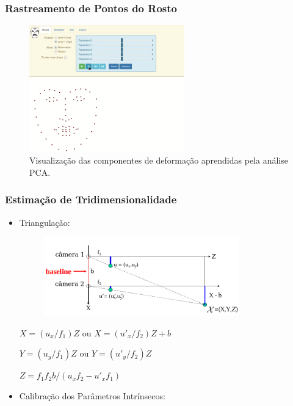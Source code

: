 \documentclass[brazil]{beamer}
\begin{document}
\begin{frame}
\frametitle{Rastreamento de Pontos do Rosto}
      \begin{figure}
          \centering
          \includegraphics[width = 0.6\textwidth, keepaspectratio]{./img/pca_exaplained.png}
          \caption{Visualização das componentes de deformação aprendidas pela análise PCA.}
      \end{figure}
\end{frame}
 

\begin{frame}
\frametitle{Estimação de Tridimensionalidade}
  \begin{itemize}
      \item Triangulação:
      
      \begin{figure}
        \centering
        \includegraphics[width = 0.8\textwidth, keepaspectratio]{./img/TG_triangulation_pdf_washington_pt2.png}
      \end{figure}
      
      $X = (u_x/f_1)  Z$ ou $ X = (u'_x/f_2)  Z + b $
      
      $Y = (u_y/f_1) Z$ ou $ Y = (u'_y/f_2) Z$
      
      $Z = f_1  f_2  b / (u_x  f_2 - u'_x  f_1)$
      
      \item Calibração dos Parâmetros Intrínsecos:
  \end{itemize} 
\end{frame}
\end{document}
